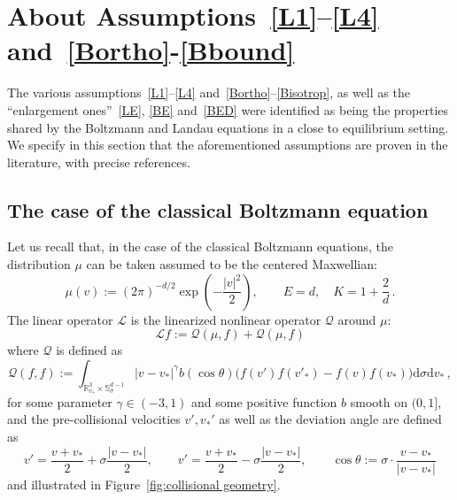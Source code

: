 \documentclass[10pt]{amsart}
\theoremstyle{definition}\newtheorem{defi}[theo]{Definition}\newtheorem{rema}[theo]{Remark}\newtheorem{exam}[theo]{Example}\newtheorem{exem}[theo]{Example}\newtheorem{nota}[theo]{Notation}
\renewcommand{\d}{\mathrm{d}}
\newcommand{\R}{\mathbb{R}}
\renewcommand{\S}{\mathbb{S}}
\newcommand{\LL}{\mathcal{L}}
\newcommand{\QQ}{\mathcal{Q}}
\begin{document}
\appendix
\section{About Assumptions~\ref{L1}--\ref{L4} and~\ref{Bortho}-\ref{Bbound}}\label{sec:Landau-Boltz}

The various assumptions~\eqref{L1}--\eqref{L4} and~\eqref{Bortho}--\eqref{Bisotrop}, as well as the ``enlargement ones''~\eqref{LE}, \eqref{BE} and~\eqref{BED} were identified as being the properties shared by the Boltzmann and Landau equations in a close to equilibrium setting. We specify in this section that the aforementioned assumptions are proven in the literature, with precise references.

\subsection{The case of the classical Boltzmann equation}

Let us recall that, in the case of the classical Boltzmann equations, the distribution $\mu$ can be taken assumed to be the centered Maxwellian:
\[
\mu(v) := (2 \pi)^{-d/2} \exp\left(- \frac{|v|^2}{2} \right), \qquad E = d, \quad K = 1 + \frac{2}{d} \,.
\]
The linear operator $\LL$ is the linearized nonlinear operator $\QQ$ around $\mu$:
\[
\LL f := \QQ(\mu, f) + \QQ(\mu, f)
\]
where $\QQ$ is defined as
\[
\QQ(f, f) := \int_{\R^3_{v_*} \times \S^{d-1}_\sigma } | v - v_* |^\gamma b(\cos \theta) \Big(f(v') f(v'_*) - f(v) f(v_*) \Big) \d \sigma \d v_* \,,
\]
for some parameter $\gamma \in (-3, 1)$ and some positive function $b$ smooth on $(0, 1]$, and the pre-collisional velocities $v', v_*'$ as well as the deviation angle are defined as
\[
v' = \frac{v+v_*}{2} + \sigma \frac{|v - v_* |}{2}, \qquad v' = \frac{v+v_*}{2} - \sigma \frac{|v - v_* |}{2}, \qquad \cos \theta := \sigma \cdot \frac{v-v_*}{ | v - v_* | }
\]
and illustrated in Figure~\ref{fig:collisional geometry}.
\end{document}
